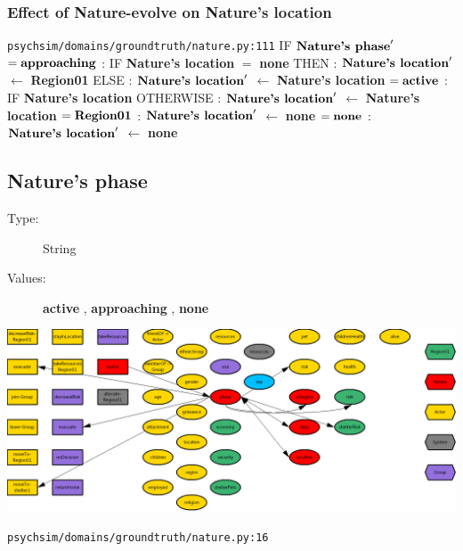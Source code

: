 \documentclass{article}%
\begin{document}
\subsubsection{Effect of Nature{-}evolve on Nature's location}%
\label{ssubsec:Effect of Nature{-}evolve on Nature's location}%
\begin{flushleft}%
\verb|psychsim/domains/groundtruth/nature.py:111|%
\linebreak%
IF %
$\mbox{\textbf{Nature's phase}} '$%
\linebreak%
\hspace*{2em}%
$= \mbox{\textbf{approaching}}$%
: %
IF %
\textbf{Nature's location}%
$=$%
\textbf{none}%
\linebreak%
\hspace*{4em}%
THEN %
: %
$\mbox{\textbf{Nature's location}} '$%
$\leftarrow$%
\textbf{Region01}%
\linebreak%
\hspace*{4em}%
ELSE %
: %
$\mbox{\textbf{Nature's location}} '$%
$\leftarrow$%
\textbf{Nature's location}%
\linebreak%
\hspace*{2em}%
$= \mbox{\textbf{active}}$%
: %
IF %
\textbf{Nature's location}%
\linebreak%
\hspace*{4em}%
OTHERWISE %
: %
$\mbox{\textbf{Nature's location}} '$%
$\leftarrow$%
\textbf{Nature's location}%
\linebreak%
\hspace*{4em}%
$= \mbox{\textbf{Region01}}$%
: %
$\mbox{\textbf{Nature's location}} '$%
$\leftarrow$%
\textbf{none}%
\linebreak%
\hspace*{2em}%
$= \mbox{\textbf{none}}$%
: %
$\mbox{\textbf{Nature's location}} '$%
$\leftarrow$%
\textbf{none}%
\end{flushleft}

%
\subsection{Nature's phase}%
\label{subsec:Nature's phase}%
\begin{description}%
\item[Type:]%
String%
\item[Values:]%
\textbf{active}%
, %
\textbf{approaching}%
, %
\textbf{none}%
\end{description}%
\includegraphics[width=\textwidth]{images/phaseOfNature.png}%
\begin{flushleft}%
\verb|psychsim/domains/groundtruth/nature.py:16|%
\end{flushleft}%
\end{document}
